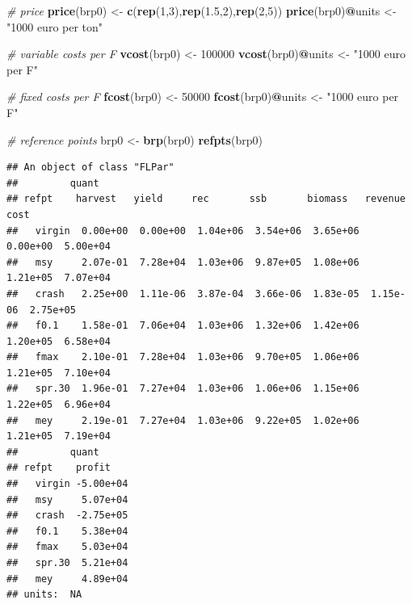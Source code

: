\documentclass[
]{book}
\newenvironment{Shaded}{\begin{snugshade}}{\end{snugshade}}
\newcommand{\CommentTok}[1]{\textcolor[rgb]{0.56,0.35,0.01}{\textit{#1}}}
\newcommand{\DecValTok}[1]{\textcolor[rgb]{0.00,0.00,0.81}{#1}}
\newcommand{\FloatTok}[1]{\textcolor[rgb]{0.00,0.00,0.81}{#1}}
\newcommand{\FunctionTok}[1]{\textcolor[rgb]{0.13,0.29,0.53}{\textbf{#1}}}
\newcommand{\NormalTok}[1]{#1}
\newcommand{\OtherTok}[1]{\textcolor[rgb]{0.56,0.35,0.01}{#1}}
\newcommand{\SpecialCharTok}[1]{\textcolor[rgb]{0.81,0.36,0.00}{\textbf{#1}}}
\newcommand{\StringTok}[1]{\textcolor[rgb]{0.31,0.60,0.02}{#1}}
\begin{document}
\begin{Shaded}
\begin{Highlighting}[]
\CommentTok{\# price}
\FunctionTok{price}\NormalTok{(brp0) }\OtherTok{\textless{}{-}} \FunctionTok{c}\NormalTok{(}\FunctionTok{rep}\NormalTok{(}\DecValTok{1}\NormalTok{,}\DecValTok{3}\NormalTok{),}\FunctionTok{rep}\NormalTok{(}\FloatTok{1.5}\NormalTok{,}\DecValTok{2}\NormalTok{),}\FunctionTok{rep}\NormalTok{(}\DecValTok{2}\NormalTok{,}\DecValTok{5}\NormalTok{))}
\FunctionTok{price}\NormalTok{(brp0)}\SpecialCharTok{@}\NormalTok{units }\OtherTok{\textless{}{-}} \StringTok{"1000 euro per ton"}

\CommentTok{\# variable costs per F }
\FunctionTok{vcost}\NormalTok{(brp0) }\OtherTok{\textless{}{-}} \DecValTok{100000}
\FunctionTok{vcost}\NormalTok{(brp0)}\SpecialCharTok{@}\NormalTok{units }\OtherTok{\textless{}{-}} \StringTok{"1000 euro per F"}

\CommentTok{\# fixed costs per F }
\FunctionTok{fcost}\NormalTok{(brp0) }\OtherTok{\textless{}{-}} \DecValTok{50000}
\FunctionTok{fcost}\NormalTok{(brp0)}\SpecialCharTok{@}\NormalTok{units }\OtherTok{\textless{}{-}} \StringTok{"1000 euro per F"}

\CommentTok{\# reference points}
\NormalTok{brp0 }\OtherTok{\textless{}{-}} \FunctionTok{brp}\NormalTok{(brp0)}
\FunctionTok{refpts}\NormalTok{(brp0)}
\end{Highlighting}
\end{Shaded}

\begin{verbatim}
## An object of class "FLPar"
##         quant
## refpt    harvest   yield     rec       ssb       biomass   revenue   cost     
##   virgin  0.00e+00  0.00e+00  1.04e+06  3.54e+06  3.65e+06  0.00e+00  5.00e+04
##   msy     2.07e-01  7.28e+04  1.03e+06  9.87e+05  1.08e+06  1.21e+05  7.07e+04
##   crash   2.25e+00  1.11e-06  3.87e-04  3.66e-06  1.83e-05  1.15e-06  2.75e+05
##   f0.1    1.58e-01  7.06e+04  1.03e+06  1.32e+06  1.42e+06  1.20e+05  6.58e+04
##   fmax    2.10e-01  7.28e+04  1.03e+06  9.70e+05  1.06e+06  1.21e+05  7.10e+04
##   spr.30  1.96e-01  7.27e+04  1.03e+06  1.06e+06  1.15e+06  1.22e+05  6.96e+04
##   mey     2.19e-01  7.27e+04  1.03e+06  9.22e+05  1.02e+06  1.21e+05  7.19e+04
##         quant
## refpt    profit   
##   virgin -5.00e+04
##   msy     5.07e+04
##   crash  -2.75e+05
##   f0.1    5.38e+04
##   fmax    5.03e+04
##   spr.30  5.21e+04
##   mey     4.89e+04
## units:  NA
\end{verbatim}
\end{document}
